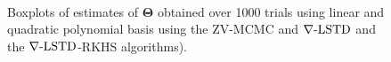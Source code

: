 \begin{figure}[htbp]
	\centering
	\mbox{
	}
	\mbox{
	} 
	\caption{Boxplots of estimates of $\boldsymbol{\Theta}$ obtained over 1000 trials using linear and quadratic polynomial basis using the ZV-MCMC and $\nabla\text{-LSTD}$ and the $\nabla\text{-LSTD}$-RKHS algorithms).}
  \label{fig:mcmc_box_plots_Theta}
\end{figure}

